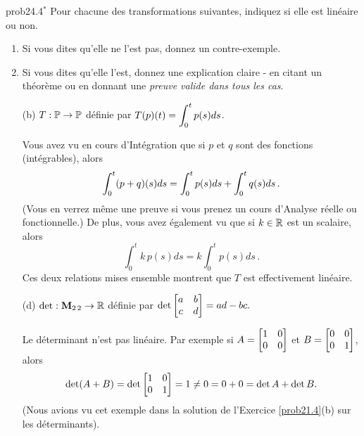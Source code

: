 \bigskip
\begin{sol}{prob24.4}$^\ast$ Pour chacune des transformations suivantes, indiquez si elle est linéaire ou non.   
   \smallskip    
\begin{enumerate}[$\bullet$]
\item Si vous dites qu'elle ne l'est pas, donnez un contre-exemple.   
\item Si vous dites qu'elle l'est, donnez une explication claire - en citant un théorème ou en donnant une {\it preuve valide dans tous les cas}. 
\end{enumerate}
 \medskip
\begin{enumerate}[ ]
 
\item[(b)] $T: \mathbb{P} \to \mathbb{P}$ d\'efinie par $T(p)(t)=\displaystyle \int_0^tp(s) ds$.

\soln Vous avez vu en cours d'Intégration que si $p$ et $q$ sont des fonctions (intégrables), alors  
$$\displaystyle \int_0^t(p+q)(s) ds= \displaystyle \int_0^tp(s) ds+ \displaystyle \int_0^tq(s) ds\,.$$ 
(Vous en verrez même une preuve si vous prenez un cours d'Analyse réelle ou fonctionnelle.)
De plus, vous avez également vu que si $k\in \mathbb{R}$ est un scalaire, alors 
$$\int_0^t k\,p(s) ds= k\int_0^tp(s) ds\,.$$ 
Ces deux relations mises ensemble montrent que $T$ est effectivement linéaire.
\medskip 
 
\item[(d)] $\det: \mathbf{M}_{2\,2} \to \mathbb{R}$ d\'efinie par $\det \bmatrix a&b\\c&d\endbmatrix = ad-bc.$

\soln Le déterminant n'est pas linéaire. Par exemple si $A=\bmatrix 1&0\cr0&0\endbmatrix$ et $B=\bmatrix 0&0\cr0&1\endbmatrix$, alors $$\det(A+B)=\det \bmatrix 1&0\cr0&1\endbmatrix =1 \not= 0=0+0= \det A + \det B.$$ (Nous avions vu cet exemple dans la solution de l'Exercice \ref{prob21.4}(b) sur les déterminants).
\medskip 
\end{enumerate}
\end{sol}